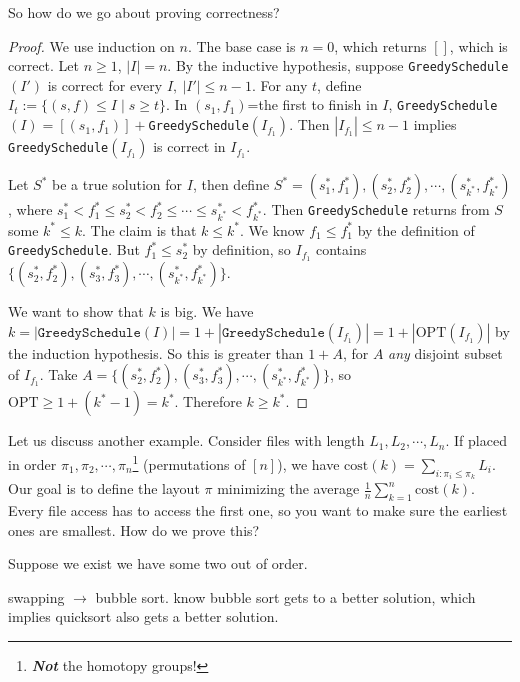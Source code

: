 So how do we go about proving correctness?
\begin{proof} We use induction on $n$. The base case is $n=0$, which returns $[]$, which is correct. Let $n\geq 1$, $|I|=n$. By the inductive hypothesis, suppose \texttt{GreedySchedule}$(I')$ is correct for every $I,\ |I'| \leq n-1$. For any $t$, define $I_t := \{(s,f) \leq I \mid  s \geq t\} $. In $(s_1,f_1)$=the first to finish in $I$, \texttt{GreedySchedule}$(I)=[(s_1,f_1)]+$\texttt{GreedySchedule}$(I_{f_1})$. Then $|I_{f_1}|\leq n-1$ implies \texttt{GreedySchedule}$(I_{f_1})$ is correct in $I_{f_1}$.

    Let $S^*$ be a true solution for $I$, then define $S^*=(s_1^*,f_1^*), (s_2^*,f_2^*),\cdots ,(s^*_{k^*},f^*_{k^*})$, where $s_1^* < f_1^* \leq s_2^* < f_2^* \leq \cdots  \leq s_{k^*}^* < f_{k^*}^*$. Then \texttt{GreedySchedule} returns from $S$ some $k^* \leq k$. The claim is that $k \leq k^*$. We know $f_1 \leq f_1^*$ by the definition of \texttt{GreedySchedule}. But $f_1^* \leq s_2^*$ by definition, so $I_{f_1}$ contains $\{(s_2^*,f_2^*),(s_3^*,f_3^*),\cdots ,(s_{k^*} ^*,f_{k^*} ^*)\} $. 

    We want to show that $k$ is big. We have $k=|\texttt{GreedySchedule}(I)|=1+|\texttt{GreedySchedule}(I_{f_1})|=1+|\mathrm{OPT}(I_{f_1})|$ by the induction hypothesis. So this is greater than $1+A$, for $A$ \emph{any} disjoint subset of $I_{f_1}$. Take $A=\{(s_2^*,f_2^*),(s_3^*,f_3^*),\cdots ,(s_{k^*} ^*,f_{k^*} ^*)\} $, so $\mathrm{OPT}\geq 1+(k^*-1)=k^*$. Therefore $k \geq k^*$.
\end{proof}
\begin{example}
    Let us discuss another example. Consider files with length $L_1,L_2, \cdots ,L_n $. If placed in order $\pi_1,\pi_2, \cdots ,\pi_n $\footnote{\emph{\textbf{Not}} the homotopy groups!} (permutations of $[n]$), we have $\mathrm{cost}(k)=\sum _{i \colon \pi_i  \leq \pi_k}L_i $. Our goal is to define the layout $\pi$ minimizing the average $\frac{1}{n}\sum _{k=1}^n \mathrm{co st}(k)$. Every file access has to access the first one, so you want to make sure the earliest ones are smallest. How do we prove this?

    Suppose we exist we have some two out of order.

    swapping $\to $ bubble sort. know bubble sort gets to a better solution, which implies quicksort also gets a better solution.
\end{example}
